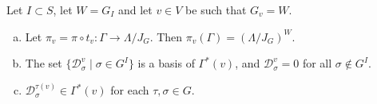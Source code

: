 \documentclass[11pt,fleqn]{article}
\newcommand\DD{\mathcal D}
\renewcommand\to{\longrightarrow}
\begin{document}
\begin{Lemma*}
\label{L:gamma-spaces}
Let $I \subset S$, let $W = G_I$ and let $v \in V$ be such that $G_v = W$.
\begin{enumerate}[(a)]
\item 
\label{i:translate-invariant}
Let $\pi_v = \pi \circ t_v: \Gamma \to \Lambda/J_G$. Then $\pi_v(\Gamma) = 
(\Lambda/J_G)^W$.

\item 
\label{i:ps-dual}
The set $\{\DD_\sigma^v \mid \sigma \in G^I\}$ is a basis of $\Gamma^*(v)$, 
and $\DD_\sigma^v = 0$ for all $\sigma \notin G^I$.

\item
\label{i:permute}
$\DD^{\tau(v)}_\sigma \in \Gamma^*(v)$ for each $\tau, \sigma \in G$.
\end{enumerate}
\end{Lemma*}
\end{document}
